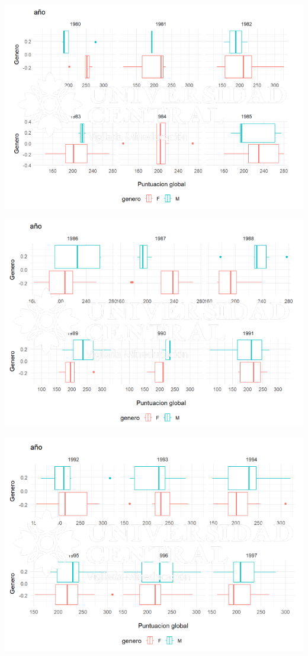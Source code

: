 \documentclass{article}
\begin{document}
\begin{center}
\includegraphics[scale=0.5]{Captura10.PNG} 
\end{center}
\begin{center}
\includegraphics[scale=0.5]{Captura11.PNG} 
\end{center}
\begin{center}
\includegraphics[scale=0.5]{Captura12.PNG} 
\end{center}
\end{document}
